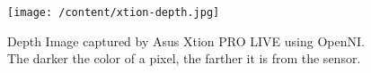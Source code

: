 \begin{figure}
	[h]
	\centering 
	\texttt{[image: /content/xtion-depth.jpg]} 	
	\caption{Depth Image captured by Asus Xtion PRO LIVE using OpenNI. The darker the color of a pixel, the farther it is from the sensor. \cite{9} } \label{fg:xtion:depth} 
\end{figure}

